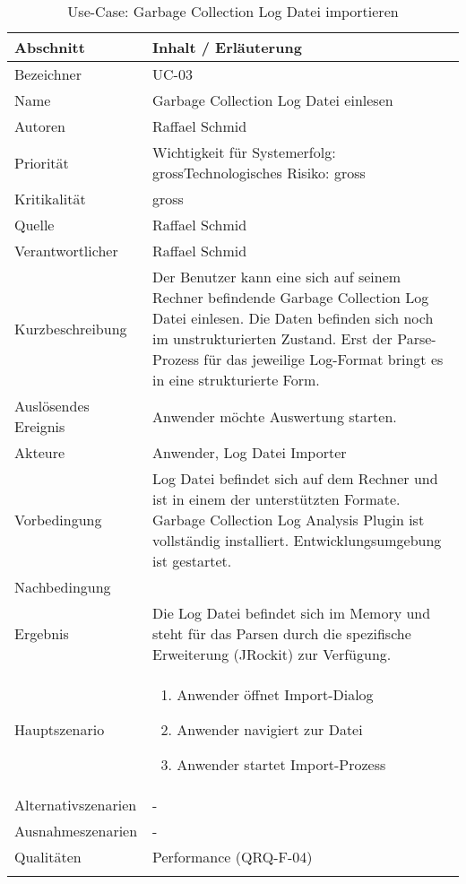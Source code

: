\begin{longtable}{|p{4cm}|p{10.5cm}|}
\hline
   \textbf{Abschnitt} & \textbf{Inhalt / Erläuterung} \\\hline
   Bezeichner & UC-03\\\hline
   Name & Garbage Collection Log Datei einlesen\\\hline
   Autoren & Raffael Schmid\\\hline
   Priorität & Wichtigkeit für Systemerfolg: gross\newline Technologisches Risiko: gross\\\hline
   Kritikalität & gross\\\hline
   Quelle & Raffael Schmid\\\hline
   Verantwortlicher & Raffael Schmid\\\hline
   Kurzbeschreibung & Der Benutzer kann eine sich auf seinem Rechner befindende Garbage Collection Log Datei einlesen. Die Daten befinden sich noch im unstrukturierten Zustand. Erst der Parse-Prozess für das jeweilige Log-Format bringt es in eine strukturierte Form.\\\hline
   Auslösendes Ereignis & Anwender möchte Auswertung starten.\\\hline
   Akteure & Anwender, Log Datei Importer\\\hline
   Vorbedingung & Log Datei befindet sich auf dem Rechner und ist in einem der unterstützten Formate. Garbage Collection Log Analysis Plugin ist vollständig installiert. Entwicklungsumgebung ist gestartet.\\\hline
   Nachbedingung & \\\hline
   Ergebnis & Die Log Datei befindet sich im Memory und steht für das Parsen durch die spezifische Erweiterung (JRockit) zur Verfügung.\\\hline
   Hauptszenario & 
	\begin{enumerate}
		\item Anwender öffnet Import-Dialog
		\item Anwender navigiert zur Datei
		\item Anwender startet Import-Prozess
	\end{enumerate}
	\\\hline
   Alternativszenarien & -\\\hline
   Ausnahmeszenarien & -\\\hline
   Qualitäten & Performance (QRQ-F-04)\\\hline
\caption{Use-Case: Garbage Collection Log Datei importieren}
\end{longtable}

